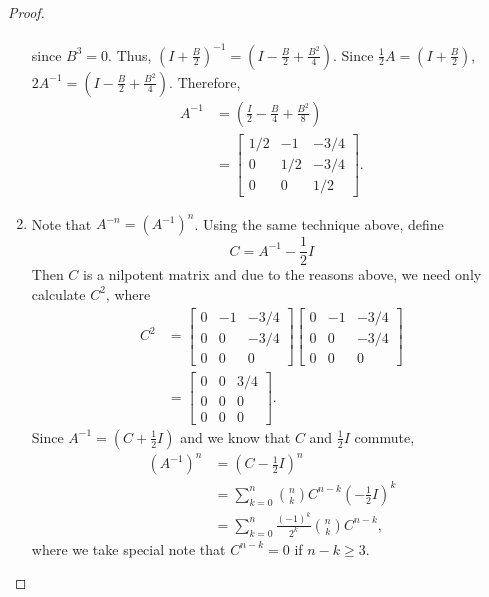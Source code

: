 \documentclass[12pt]{article}
\theoremstyle{definition}
\begin{document}
\begin{proof}
\begin{enumerate}
\begin{align*}
      \end{align*}
      since $B^3 = 0$. Thus, $\left(I + \frac{B}{2}\right)^{-1} = \left(I - \frac{B}{2} + \frac{B^2}{4}\right)$.
      Since $\frac{1}{2}A =  \left(I + \frac{B}{2}\right)$, $2A^{-1} = \left(I - \frac{B}{2} + \frac{B^2}{4}\right)$.
      Therefore,
      \begin{align*}
        A^{-1} &= \left(\frac{I}{2} - \frac{B}{4} + \frac{B^2}{8}\right) \\
        &= \begin{bmatrix}1/2 & -1 & -3/4\\ 0 & 1/2 & -3/4 \\ 0 & 0 & 1/2\end{bmatrix}.
      \end{align*}
    \item Note that $A^{-n} = (A^{-1})^n$. Using the same technique above,
      define
      \[
        C = A^{-1} - \frac{1}{2}I
      \] Then $C$ is a nilpotent
      matrix and due to the reasons above, we need only calculate $C^2$, where
      \begin{align*}
        C^2 &= \begin{bmatrix}0 & -1 & -3/4\\ 0 & 0 & -3/4 \\ 0 & 0 & 0\end{bmatrix}\begin{bmatrix}0 & -1 & -3/4\\ 0 & 0 & -3/4 \\ 0 & 0 & 0\end{bmatrix} \\
        &= \begin{bmatrix}0 & 0 & 3/4 \\ 0 & 0 & 0 \\ 0 & 0 & 0\end{bmatrix}.
      \end{align*}
      Since $A^{-1} = (C + \frac{1}{2}I)$ and we know that $C$ and $\frac{1}{2}I$
      commute,
      \begin{align*}
        (A^{-1})^n
        &= \left(C - \frac{1}{2}I\right)^n \\
        &= \sum_{k=0}^n {n \choose k} C^{n-k} \left(-\frac{1}{2}I\right)^k \\
        &= \sum_{k=0}^n \frac{(-1)^k}{2^k} {n \choose k} C^{n-k},
      \end{align*}
      where we take special note that $C^{n-k} = 0$ if $n - k \geq 3$.
  \end{enumerate}
\end{proof}
\end{document}
